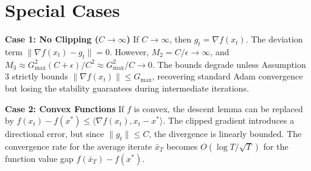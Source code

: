 \documentclass{article}
\begin{document}
\section*{Special Cases}
\textbf{Case 1: No Clipping ($C \to \infty$)}
If $C \to \infty$, then $g_t = \nabla f(x_t)$. The deviation term $\|\nabla f(x_t) - g_t\| = 0$. However, $M_2 = C/\epsilon \to \infty$, and $M_3 \approx G_{\max}^2 (C+\epsilon)/C^2 \approx G_{\max}^2/C \to 0$. The bounds degrade unless Assumption 3 strictly bounds $\|\nabla f(x_t)\| \leq G_{\max}$, recovering standard Adam convergence but losing the stability guarantees during intermediate iterations.

\textbf{Case 2: Convex Functions}
If $f$ is convex, the descent lemma can be replaced by $f(x_t) - f(x^*) \leq \langle \nabla f(x_t), x_t - x^* \rangle$. The clipped gradient introduces a directional error, but since $\|g_t\| \leq C$, the divergence is linearly bounded. The convergence rate for the average iterate $\bar{x}_T$ becomes $O(\log T / \sqrt{T})$ for the function value gap $f(\bar{x}_T) - f(x^*)$.
\end{document}
